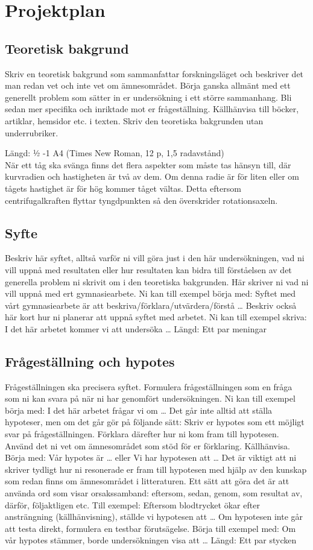 \section{Projektplan}
\subsection{Teoretisk bakgrund}
Skriv en teoretisk bakgrund som sammanfattar forskningsläget och beskriver det man redan vet och inte vet om ämnesområdet. Börja ganska allmänt med ett generellt problem som sätter in er undersökning i ett större sammanhang. Bli sedan mer specifika och inriktade mot er frågeställning. Källhänvisa till böcker, artiklar, hemsidor etc. i texten. Skriv den teoretiska bakgrunden utan underrubriker.

Längd: ½ -1 A4 (Times New Roman, 12 p, 1,5 radavstånd)
\\[2em]
När ett tåg ska svänga finns det flera aspekter som måste tas hänsyn till, där kurvradien och hastigheten är två av dem. Om denna radie är för liten eller om tågets hastighet är för hög kommer tåget vältas. Detta eftersom centrifugalkraften flyttar tyngdpunkten så den överskrider rotationsaxeln.
\subsection{Syfte}
Beskriv här syftet, alltså varför ni vill göra just i den här undersökningen, vad ni vill uppnå med resultaten eller hur resultaten kan bidra till förståelsen av det generella problem ni skrivit om i den teoretiska bakgrunden. Här skriver ni vad ni vill uppnå med ert gymnasiearbete. Ni kan till exempel börja med: Syftet med vårt gymnasiearbete är att beskriva/förklara/utvärdera/förstå … Beskriv också här kort hur ni planerar att uppnå syftet med arbetet. Ni kan till exempel skriva: I det här arbetet kommer vi att undersöka …
Längd: Ett par meningar

\subsection{Frågeställning och hypotes}
Frågeställningen ska precisera syftet. Formulera frågeställningen som en fråga som ni kan svara på när ni har genomfört undersökningen. Ni kan till exempel börja med: I det här arbetet frågar vi om …
Det går inte alltid att ställa hypoteser, men om det går gör på följande sätt: Skriv er hypotes som ett möjligt svar på frågeställningen. Förklara därefter hur ni kom fram till hypotesen. Använd det ni vet om ämnesområdet som stöd för er förklaring. Källhänvisa. Börja med: Vår hypotes är … eller Vi har hypotesen att … Det är viktigt att ni skriver tydligt hur ni resonerade er fram till hypotesen med hjälp av den kunskap som redan finns om ämnesområdet i litteraturen. Ett sätt att göra det är att använda ord som visar orsakssamband: eftersom, sedan, genom, som resultat av, därför, följaktligen etc. Till exempel: Eftersom blodtrycket ökar efter ansträngning (källhänvisning), ställde vi hypotesen att … Om hypotesen inte går att testa direkt, formulera en testbar förutsägelse. Börja till exempel med: Om vår hypotes stämmer, borde undersökningen visa att …
Längd: Ett par stycken

